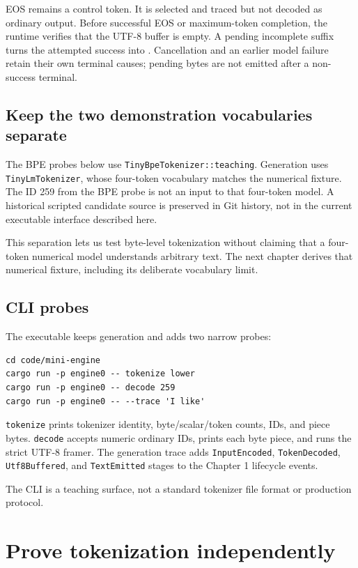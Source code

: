 EOS remains a control token. It is selected and traced but not decoded
as ordinary output. Before successful EOS or maximum-token completion,
the runtime verifies that the UTF-8 buffer is empty. A pending
incomplete suffix turns the attempted success into
\texttt{}. Cancellation and an earlier
model failure retain their own terminal causes; pending bytes are not
emitted after a non-success terminal.

\subsection{Keep the two demonstration vocabularies separate}
\label{separate-demonstration-vocabularies}
The BPE probes below use \texttt{TinyBpeTokenizer::teaching}. Generation uses
\texttt{TinyLmTokenizer}, whose four-token vocabulary matches the numerical
fixture. The ID 259 from the BPE probe is not an input to that four-token
model. A historical scripted candidate source is preserved in Git history,
not in the current executable interface described here.

This separation lets us test byte-level tokenization without claiming that a
four-token numerical model understands arbitrary text. The next chapter
derives that numerical fixture, including its deliberate vocabulary limit.

\subsection{CLI probes}\label{cli-probes}

The executable keeps generation and adds two narrow probes:

\begin{verbatim}
cd code/mini-engine
cargo run -p engine0 -- tokenize lower
cargo run -p engine0 -- decode 259
cargo run -p engine0 -- --trace 'I like'
\end{verbatim}

\texttt{tokenize} prints tokenizer identity, byte/scalar/token counts,
IDs, and piece bytes. \texttt{decode} accepts numeric ordinary IDs,
prints each byte piece, and runs the strict UTF-8 framer. The generation
trace adds \texttt{InputEncoded}, \texttt{TokenDecoded},
\texttt{Utf8Buffered}, and \texttt{TextEmitted} stages to the Chapter 1
lifecycle events.

The CLI is a teaching surface, not a standard tokenizer file format or
production protocol.

\section{Prove tokenization
independently}\label{prove-tokenization-independently}

